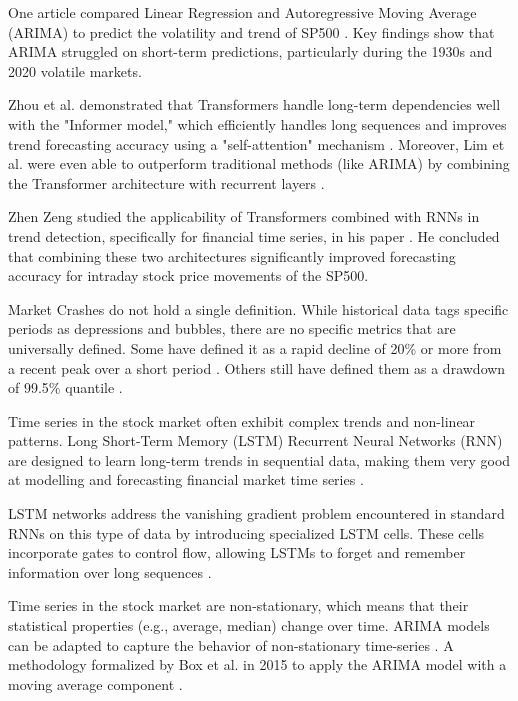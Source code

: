 \documentclass[12pt, letterpaper]{article}
\begin{document}
\begin{multicols}{2}
One article compared Linear Regression and Autoregressive Moving Average (ARIMA) to predict the volatility and trend of SP500 \cite{sp500arimalstmregression}. 
Key findings show that ARIMA struggled on short-term predictions, particularly during the 1930s and 2020 volatile markets.

Zhou et al. demonstrated that Transformers handle long-term dependencies well with the "Informer model," which efficiently handles long sequences and improves trend forecasting accuracy using a "self-attention" mechanism \cite{zhou2021informer}. 
Moreover, Lim et al. were even able to outperform traditional methods (like ARIMA) by combining the Transformer architecture with recurrent layers \cite{lim2021temporal}.

Zhen Zeng studied the applicability of Transformers combined with RNNs in trend detection, specifically for financial time series, in his paper \cite{zeng2023financial}. 
He concluded that combining these two architectures significantly improved forecasting accuracy for intraday stock price movements of the SP500.

Market Crashes do not hold a single definition. While historical data tags specific periods as depressions and bubbles, there are no specific metrics that are universally defined. Some have defined it as a rapid decline of 20\% or more from a recent peak over a short period \cite{Fonville, Investo}. Others still have defined them as a drawdown of 99.5\% quantile \cite{99.5quantile}.

Time series in the stock market often exhibit complex trends and non-linear patterns. Long Short-Term Memory (LSTM) Recurrent Neural Networks (RNN) are designed to learn long-term trends in sequential data, making them very good at modelling and forecasting financial market time series \cite{hochreiter1997, greff2017}.

LSTM networks address the vanishing gradient problem encountered in standard RNNs on this type of data by introducing specialized LSTM cells. These cells incorporate gates to control flow, allowing LSTMs to forget and remember information over long sequences \cite{hochreiter1997}. 

Time series in the stock market are non-stationary, which means that their statistical properties (e.g., average, median) change over time. ARIMA models can be adapted to capture the behavior of non-stationary time-series \cite{ho2021}. A methodology formalized by Box et al. in 2015 to apply the ARIMA model with a moving average component \cite{box2015}. 


\end{multicols}
\end{document}
